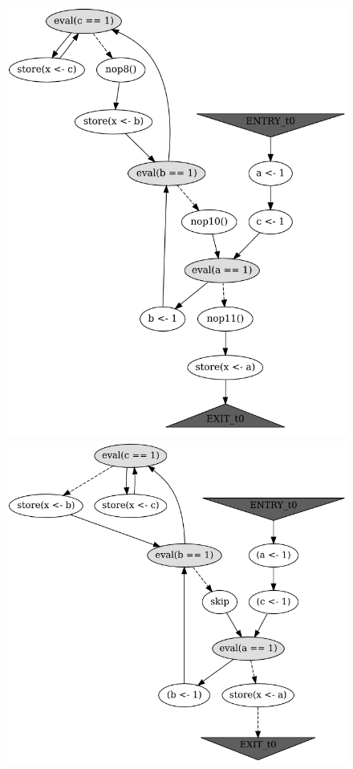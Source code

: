 \begin{figure}[!h]
%
\begin{minipage}{.49\textwidth}
  \includegraphics[width=\textwidth,keepaspectratio]{img/my/graphs/unrolling-comparison/PorthosC/t0.png}
\end{minipage}
%
\begin{minipage}{.49\textwidth}
  \includegraphics[width=\textwidth,keepaspectratio]{img/my/graphs/unrolling-comparison/Porthos/t0.png}

\end{minipage}
\end{figure}
